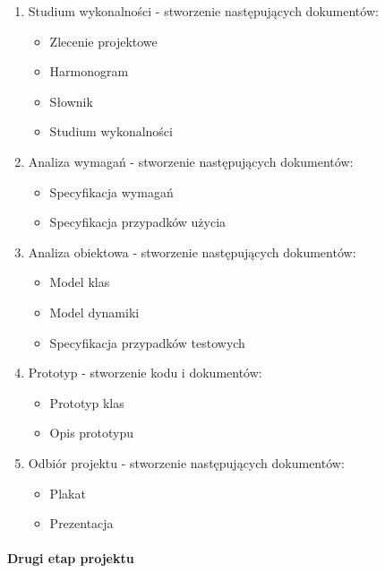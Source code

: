 \documentclass[a4paper,10pt]{article}
\begin{document}
\begin{enumerate}
 \item Studium wykonalności - stworzenie następujących dokumentów:
	\begin{itemize}
 		\item  Zlecenie projektowe
		\item  Harmonogram
		\item Słownik
		\item Studium wykonalności
	\end{itemize}

\item Analiza wymagań - stworzenie następujących dokumentów:
	\begin{itemize}
 		\item Specyfikacja wymagań
		\item Specyfikacja przypadków użycia
	\end{itemize}


\item Analiza obiektowa - stworzenie następujących dokumentów:
	\begin{itemize}
 		\item Model klas
		\item Model dynamiki
		\item Specyfikacja przypadków testowych
	\end{itemize}

\item Prototyp - stworzenie kodu i dokumentów:
	\begin{itemize}
 		\item Prototyp klas
		\item Opis prototypu
	\end{itemize}

\item Odbiór projektu - stworzenie następujących dokumentów:
	\begin{itemize}
 		\item Plakat
		\item Prezentacja
	\end{itemize}

\end{enumerate}

\paragraph{} \textbf{Drugi etap projektu}
\end{document}
